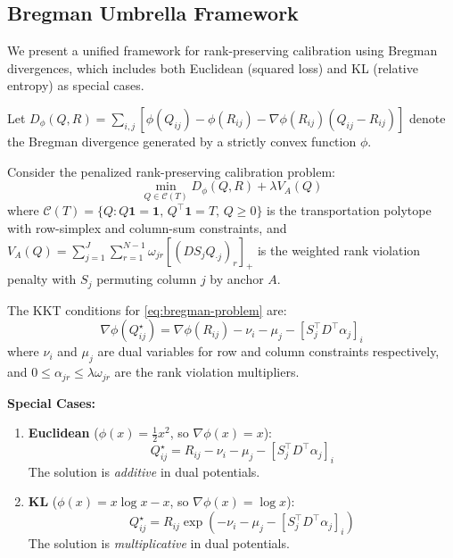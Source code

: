 

\subsection{Bregman Umbrella Framework}

We present a unified framework for rank-preserving calibration using Bregman divergences,
which includes both Euclidean (squared loss) and KL (relative entropy) as special cases.

Let $D_\phi(Q,R) = \sum_{i,j} \left[\phi(Q_{ij}) - \phi(R_{ij}) - \nabla\phi(R_{ij})(Q_{ij} - R_{ij})\right]$
denote the Bregman divergence generated by a strictly convex function $\phi$.

\begin{theorem}
\label{thm:bregman-kkt}
Consider the penalized rank-preserving calibration problem:
\begin{equation}
\min_{Q \in \mathcal{C}(T)} D_\phi(Q, R) + \lambda V_A(Q)
\label{eq:bregman-problem}
\end{equation}
where $\mathcal{C}(T) = \{Q : Q \mathbf{1} = \mathbf{1}, \, Q^\top \mathbf{1} = T, \, Q \geq 0\}$
is the transportation polytope with row-simplex and column-sum constraints,
and $V_A(Q) = \sum_{j=1}^J \sum_{r=1}^{N-1} \omega_{jr} [(D S_j Q_{\cdot j})_r]_+$
is the weighted rank violation penalty with $S_j$ permuting column $j$ by anchor $A$.

The KKT conditions for \eqref{eq:bregman-problem} are:
\begin{equation}
\nabla \phi(Q^\star_{ij}) = \nabla \phi(R_{ij}) - \nu_i - \mu_j - [S_j^\top D^\top \alpha_j]_i
\label{eq:bregman-kkt}
\end{equation}
where $\nu_i$ and $\mu_j$ are dual variables for row and column constraints respectively,
and $0 \leq \alpha_{jr} \leq \lambda \omega_{jr}$ are the rank violation multipliers.

\medskip
\noindent\textbf{Special Cases:}

\begin{enumerate}[label=(\alph*)]
\item \textbf{Euclidean} ($\phi(x) = \frac{1}{2}x^2$, so $\nabla\phi(x) = x$):
\begin{equation}
Q^\star_{ij} = R_{ij} - \nu_i - \mu_j - [S_j^\top D^\top \alpha_j]_i
\end{equation}
The solution is \emph{additive} in dual potentials.

\item \textbf{KL} ($\phi(x) = x \log x - x$, so $\nabla\phi(x) = \log x$):
\begin{equation}
Q^\star_{ij} = R_{ij} \exp\left(-\nu_i - \mu_j - [S_j^\top D^\top \alpha_j]_i\right)
\end{equation}
The solution is \emph{multiplicative} in dual potentials.
\end{enumerate}
\end{theorem}

